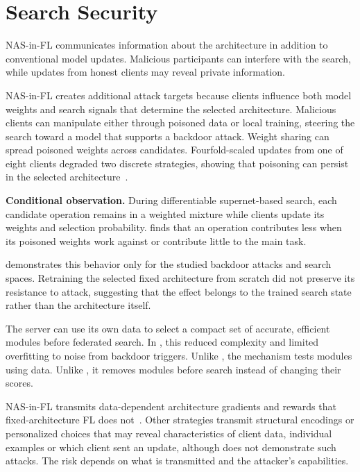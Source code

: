 \section{Search Security}

NAS-in-FL communicates information about the architecture in addition to conventional model updates. Malicious participants can interfere with the search, while updates from honest clients may reveal private information.


NAS-in-FL creates additional attack targets because clients influence both model weights and search signals that determine the selected architecture. Malicious clients can manipulate either through poisoned data or local training, steering the search toward a model that supports a backdoor attack. Weight sharing can spread poisoned weights across candidates. Fourfold-scaled updates from one of eight clients degraded two discrete strategies, showing that poisoning can persist in the selected architecture~\cite{privacy_preserving_fednas_for_edge_2025}.

\noindent\textbf{Conditional observation.} During differentiable supernet-based search, each candidate operation remains in a weighted mixture while clients update its weights and selection probability. \cite{privacy_preserving_fednas_for_edge_2025} finds that an operation contributes less when its poisoned weights work against or contribute little to the main task.

\cite{privacy_preserving_fednas_for_edge_2025} demonstrates this behavior only for the studied backdoor attacks and search spaces. Retraining the selected fixed architecture from scratch did not preserve its resistance to attack, suggesting that the effect belongs to the trained search state rather than the architecture itself.

 The server can use its own data to select a compact set of accurate, efficient modules before federated search. In \cite{privacy_preserving_fednas_for_edge_2025}, this reduced complexity and limited overfitting to noise from backdoor triggers. Unlike , the mechanism tests modules using data. Unlike , it removes modules before search instead of changing their scores.

NAS-in-FL transmits data-dependent architecture gradients and rewards that fixed-architecture FL does not~\cite{dp-fnas_2020,feathers_2023}. Other strategies transmit structural encodings or personalized choices that may reveal characteristics of client data, individual examples or which client sent an update, although \cite{multi-granular_fednas_2023,privacy_preserving_fednas_for_edge_2025} does not demonstrate such attacks. The risk depends on what is transmitted and the attacker's capabilities.

